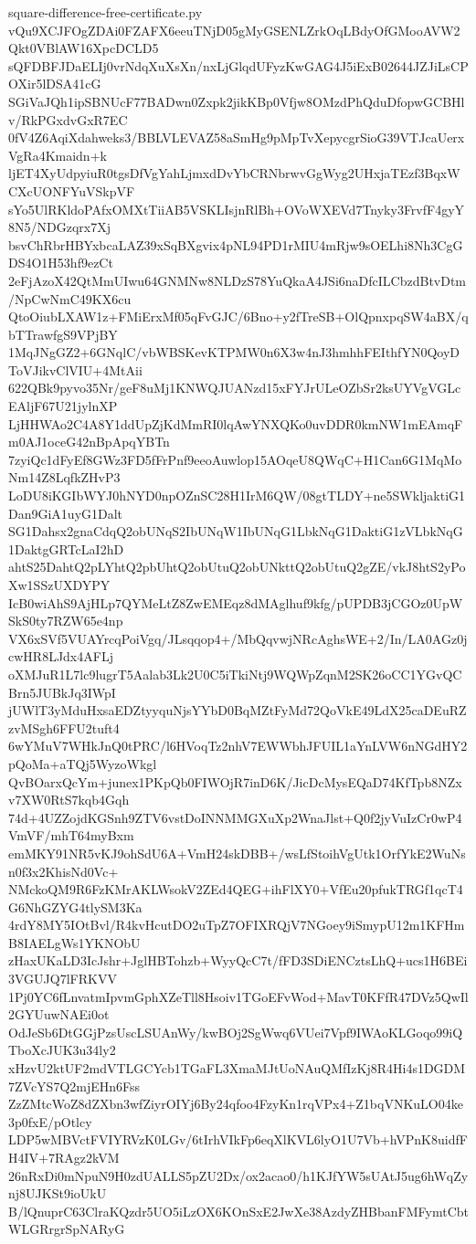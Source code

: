 \documentclass[11pt]{article}
\theoremstyle{definition}
\theoremstyle{remark}
\begin{document}
\begin{filecontents*}[overwrite]{square-difference-free-certificate.py}
vQu9XCJFOgZDAi0FZAFX6eeuTNjD05gMyGSENLZrkOqLBdyOfGMooAVW2Qkt0VBlAW16XpcDCLD5
sQFDBFJDaELIj0vrNdqXuXsXn/nxLjGlqdUFyzKwGAG4J5iExB02644JZJiLsCPOXir5lDSA41cG
SGiVaJQh1ipSBNUcF77BADwn0Zxpk2jikKBp0Vfjw8OMzdPhQduDfopwGCBHlv/RkPGxdvGxR7EC
0fV4Z6AqiXdahweks3/BBLVLEVAZ58aSmHg9pMpTvXepycgrSioG39VTJcaUerxVgRa4Kmaidn+k
ljET4XyUdpyiuR0tgsDfVgYahLjmxdDvYbCRNbrwvGgWyg2UHxjaTEzf3BqxWCXcUONFYuVSkpVF
sYo5UlRKldoPAfxOMXtTiiAB5VSKLIsjnRlBh+OVoWXEVd7Tnyky3FrvfF4gyY8N5/NDGzqrx7Xj
bsvChRbrHBYxbcaLAZ39xSqBXgvix4pNL94PD1rMIU4mRjw9sOELhi8Nh3CgGDS4O1H53hf9ezCt
2eFjAzoX42QtMmUIwu64GNMNw8NLDzS78YuQkaA4JSi6naDfcILCbzdBtvDtm/NpCwNmC49KX6cu
QtoOiubLXAW1z+FMiErxMf05qFvGJC/6Bno+y2fTreSB+OlQpnxpqSW4aBX/qbTTrawfgS9VPjBY
1MqJNgGZ2+6GNqlC/vbWBSKevKTPMW0n6X3w4nJ3hmhhFEIthfYN0QoyDToVJikvClVIU+4MtAii
622QBk9pyvo35Nr/geF8uMj1KNWQJUANzd15xFYJrULeOZbSr2ksUYVgVGLcEAljF67U21jylnXP
LjHHWAo2C4A8Y1ddUpZjKdMmRI0lqAwYNXQKo0uvDDR0kmNW1mEAmqFm0AJ1oceG42nBpApqYBTn
7zyiQc1dFyEf8GWz3FD5fFrPnf9eeoAuwlop15AOqeU8QWqC+H1Can6G1MqMoNm14Z8LqfkZHvP3
LoDU8iKGIbWYJ0hNYD0npOZnSC28H1IrM6QW/08gtTLDY+ne5SWkljaktiG1Dan9GiA1uyG1Dalt
SG1Dahsx2gnaCdqQ2obUNqS2IbUNqW1IbUNqG1LbkNqG1DaktiG1zVLbkNqG1DaktgGRTcLaI2hD
ahtS25DahtQ2pLYhtQ2pbUhtQ2obUtuQ2obUNkttQ2obUtuQ2gZE/vkJ8htS2yPoXw1SSzUXDYPY
IcB0wiAhS9AjHLp7QYMeLtZ8ZwEMEqz8dMAglhuf9kfg/pUPDB3jCGOz0UpWSkS0ty7RZW65e4np
VX6xSVf5VUAYrcqPoiVgq/JLsqqop4+/MbQqvwjNRcAghsWE+2/In/LA0AGz0jcwHR8LJdx4AFLj
oXMJuR1L7lc9lugrT5Aalab3Lk2U0C5iTkiNtj9WQWpZqnM2SK26oCC1YGvQCBrn5JUBkJq3IWpI
jUWlT3yMduHxsaEDZtyyquNjsYYbD0BqMZtFyMd72QoVkE49LdX25caDEuRZzvMSgh6FFU2tuft4
6wYMuV7WHkJnQ0tPRC/l6HVoqTz2nhV7EWWbhJFUIL1aYnLVW6nNGdHY2pQoMa+aTQj5WyzoWkgl
QvBOarxQcYm+junex1PKpQb0FIWOjR7inD6K/JicDcMysEQaD74KfTpb8NZxv7XW0RtS7kqb4Gqh
74d+4UZZojdKGSnh9ZTV6vstDoINNMMGXuXp2WnaJlst+Q0f2jyVuIzCr0wP4VmVF/mhT64myBxm
emMKY91NR5vKJ9ohSdU6A+VmH24skDBB+/wsLfStoihVgUtk1OrfYkE2WuNsn0f3x2KhisNd0Vc+
NMckoQM9R6FzKMrAKLWsokV2ZEd4QEG+ihFlXY0+VfEu20pfukTRGf1qcT4G6NhGZYG4tlySM3Ka
4rdY8MY5IOtBvl/R4kvHcutDO2uTpZ7OFIXRQjV7NGoey9iSmypU12m1KFHmB8IAELgWs1YKNObU
zHaxUKaLD3IcJshr+JglHBTohzb+WyyQcC7t/fFD3SDiENCztsLhQ+ucs1H6BEi3VGUJQ7lFRKVV
1Pj0YC6fLnvatmIpvmGphXZeTll8Hsoiv1TGoEFvWod+MavT0KFfR47DVz5QwIl2GYUuwNAEi0ot
OdJeSb6DtGGjPzsUscLSUAnWy/kwBOj2SgWwq6VUei7Vpf9IWAoKLGoqo99iQTboXcJUK3u34ly2
xHzvU2ktUF2mdVTLGCYcb1TGaFL3XmaMJtUoNAuQMfIzKj8R4Hi4s1DGDM7ZVcYS7Q2mjEHn6Fss
ZzZMtcWoZ8dZXbn3wfZiyrOIYj6By24qfoo4FzyKn1rqVPx4+Z1bqVNKuLO04ke3p0fxE/pOtlcy
LDP5wMBVctFVIYRVzK0LGv/6tIrhVIkFp6eqXlKVL6lyO1U7Vb+hVPnK8uidfFH4IV+7RAgz2kVM
26nRxDi0mNpuN9H0zdUALLS5pZU2Dx/ox2acao0/h1KJfYW5sUAtJ5ug6hWqZynj8UJKSt9ioUkU
B/lQnuprC63ClraKQzdr5UO5iLzOX6KOnSxE2JwXe38AzdyZHBbanFMFymtCbtWLGRrgrSpNARyG

\end{filecontents*}
\end{document}
